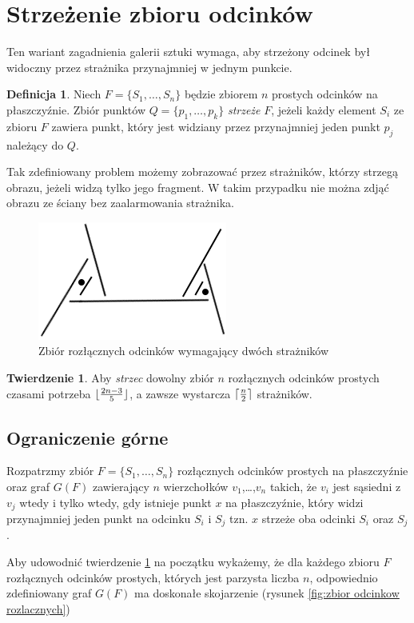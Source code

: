 \documentclass[brudnopis]{xmgr}
\DeclarePairedDelimiter\ceil{\lceil}{\rceil}
\DeclarePairedDelimiter\floor{\lfloor}{\rfloor}
\theoremstyle{definition}
\newtheorem{Twierdzenie}{Twierdzenie}
\newtheorem{Definicja}{Definicja}
\begin{document}
\section{Strzeżenie zbioru odcinków}
Ten wariant zagadnienia galerii sztuki wymaga, aby strzeżony odcinek był widoczny przez strażnika przynajmniej w jednym punkcie. 
\begin{Definicja}
Niech $F = \{S_1,\ldots,S_n\}$ będzie zbiorem $n$ prostych odcinków na płaszczyźnie. Zbiór punktów $Q = \{p_1,\ldots,p_k\}$ \emph{strzeże} $F$, jeżeli każdy element $S_i$ ze zbioru $F$ zawiera punkt, który jest widziany przez przynajmniej jeden punkt $p_j$ należący do $Q$.
\end{Definicja}
Tak zdefiniowany problem możemy zobrazować przez strażników, którzy strzegą obrazu, jeżeli widzą tylko jego fragment. W takim przypadku nie można zdjąć obrazu ze ściany bez zaalarmowania strażnika.
\begin{figure}[ht!]
 \centering
  \includegraphics{rysunki/rozlaczny_dwoch_straznikow.png}
  \caption{Zbiór rozłącznych odcinków wymagający dwóch strażników}
\end{figure} 

\begin{Twierdzenie} \label{straznicy strzezenie} \cite{illumination}
Aby \emph{strzec} dowolny zbiór $n$ rozłącznych odcinków prostych czasami potrzeba $\floor{\frac{2n-3}{5}}$, a zawsze wystarcza $\ceil{\frac{n}{2}}$ strażników.
\end{Twierdzenie}

\subsection{Ograniczenie górne}
Rozpatrzmy zbiór $F =\{S_1,\ldots,S_n\}$ rozłącznych odcinków prostych na płaszczyźnie oraz graf $G(F)$ zawierający $n$ wierzchołków $v_1$,\ldots,$v_n$ takich, że $v_i$ jest sąsiedni z $v_j$ wtedy i tylko wtedy, gdy istnieje punkt $x$ na płaszczyźnie, który widzi przynajmniej jeden punkt na odcinku $S_i$ i $S_j$ tzn. $x$ strzeże oba odcinki $S_i$ oraz $S_j$.

Aby udowodnić twierdzenie \ref{straznicy strzezenie} na początku wykażemy, że dla każdego zbioru $F$ rozłącznych odcinków prostych, których jest parzysta liczba $n$, odpowiednio zdefiniowany graf $G(F)$ ma doskonałe skojarzenie (rysunek \ref{fig:zbior odcinkow rozlacznych})
\end{document}

